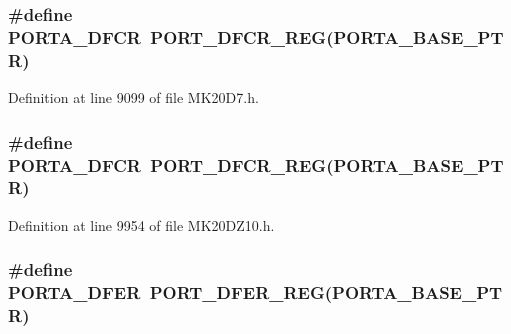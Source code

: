 \subsubsection[{\texorpdfstring{P\+O\+R\+T\+A\+\_\+\+D\+F\+CR}{PORTA_DFCR}}]{\setlength{\rightskip}{0pt plus 5cm}\#define P\+O\+R\+T\+A\+\_\+\+D\+F\+CR~{\bf P\+O\+R\+T\+\_\+\+D\+F\+C\+R\+\_\+\+R\+EG}({\bf P\+O\+R\+T\+A\+\_\+\+B\+A\+S\+E\+\_\+\+P\+TR})}\hypertarget{group___p_o_r_t___register___accessor___macros_ga651ee1b9d121708d1343316ff9ffba55}{}\label{group___p_o_r_t___register___accessor___macros_ga651ee1b9d121708d1343316ff9ffba55}


Definition at line 9099 of file M\+K20\+D7.\+h.

\subsubsection[{\texorpdfstring{P\+O\+R\+T\+A\+\_\+\+D\+F\+CR}{PORTA_DFCR}}]{\setlength{\rightskip}{0pt plus 5cm}\#define P\+O\+R\+T\+A\+\_\+\+D\+F\+CR~{\bf P\+O\+R\+T\+\_\+\+D\+F\+C\+R\+\_\+\+R\+EG}({\bf P\+O\+R\+T\+A\+\_\+\+B\+A\+S\+E\+\_\+\+P\+TR})}\hypertarget{group___p_o_r_t___register___accessor___macros_ga651ee1b9d121708d1343316ff9ffba55}{}\label{group___p_o_r_t___register___accessor___macros_ga651ee1b9d121708d1343316ff9ffba55}


Definition at line 9954 of file M\+K20\+D\+Z10.\+h.

\subsubsection[{\texorpdfstring{P\+O\+R\+T\+A\+\_\+\+D\+F\+ER}{PORTA_DFER}}]{\setlength{\rightskip}{0pt plus 5cm}\#define P\+O\+R\+T\+A\+\_\+\+D\+F\+ER~{\bf P\+O\+R\+T\+\_\+\+D\+F\+E\+R\+\_\+\+R\+EG}({\bf P\+O\+R\+T\+A\+\_\+\+B\+A\+S\+E\+\_\+\+P\+TR})}\hypertarget{group___p_o_r_t___register___accessor___macros_gaa0d8365ea1ec30cb5e4edcbc2d86e0bb}{}\label{group___p_o_r_t___register___accessor___macros_gaa0d8365ea1ec30cb5e4edcbc2d86e0bb}


